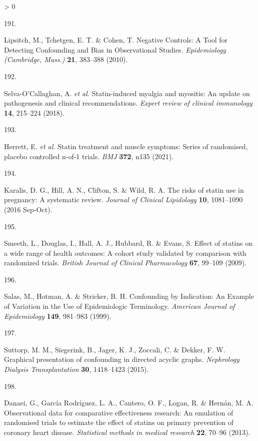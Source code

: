 \documentclass[a4paper, twoside]{templates/ociamthesis}
\newlength{\cslhangindent}
\newlength{\csllabelwidth}
\newenvironment{CSLReferences}[3] %
 {%
  \setlength{\parindent}{0pt}
  \ifodd #1 \everypar{\setlength{\hangindent}{\cslhangindent}}\ignorespaces\fi
  \ifnum #2 > 0
  \setlength{\parskip}{#2\baselineskip}
  \fi
 }%
 {}
\newcommand{\CSLLeftMargin}[1]{\parbox[t]{\maxof{\widthof{#1}}{\csllabelwidth}}{#1}}
\newcommand{\CSLRightInline}[1]{\parbox[t]{\linewidth - \csllabelwidth}{#1}}
\begin{document}
\begin{CSLReferences}{0}{0}
\leavevmode\hypertarget{ref-lipsitch2010}{}%
\CSLLeftMargin{191. }
\CSLRightInline{Lipsitch, M., Tchetgen, E. T. \& Cohen, T. Negative {Controls}: {A Tool} for {Detecting Confounding} and {Bias} in {Observational Studies}. \emph{Epidemiology (Cambridge, Mass.)} \textbf{21}, 383--388 (2010).}

\leavevmode\hypertarget{ref-selva-ocallaghan2018}{}%
\CSLLeftMargin{192. }
\CSLRightInline{Selva-O'Callaghan, A. \emph{et al.} Statin-induced myalgia and myositis: An update on pathogenesis and clinical recommendations. \emph{Expert review of clinical immunology} \textbf{14}, 215--224 (2018).}

\leavevmode\hypertarget{ref-herrett2021}{}%
\CSLLeftMargin{193. }
\CSLRightInline{Herrett, E. \emph{et al.} Statin treatment and muscle symptoms: Series of randomised, placebo controlled n-of-1 trials. \emph{BMJ} \textbf{372}, n135 (2021).}

\leavevmode\hypertarget{ref-karalis2016}{}%
\CSLLeftMargin{194. }
\CSLRightInline{Karalis, D. G., Hill, A. N., Clifton, S. \& Wild, R. A. The risks of statin use in pregnancy: {A} systematic review. \emph{Journal of Clinical Lipidology} \textbf{10}, 1081--1090 (2016 Sep-Oct).}

\leavevmode\hypertarget{ref-smeeth2009}{}%
\CSLLeftMargin{195. }
\CSLRightInline{Smeeth, L., Douglas, I., Hall, A. J., Hubbard, R. \& Evans, S. Effect of statins on a wide range of health outcomes: A cohort study validated by comparison with randomized trials. \emph{British Journal of Clinical Pharmacology} \textbf{67}, 99--109 (2009).}

\leavevmode\hypertarget{ref-salas1999}{}%
\CSLLeftMargin{196. }
\CSLRightInline{Salas, M., Hotman, A. \& Stricker, B. H. Confounding by {Indication}: {An Example} of {Variation} in the {Use} of {Epidemiologic Terminology}. \emph{American Journal of Epidemiology} \textbf{149}, 981--983 (1999).}

\leavevmode\hypertarget{ref-suttorp2015}{}%
\CSLLeftMargin{197. }
\CSLRightInline{Suttorp, M. M., Siegerink, B., Jager, K. J., Zoccali, C. \& Dekker, F. W. Graphical presentation of confounding in directed acyclic graphs. \emph{Nephrology Dialysis Transplantation} \textbf{30}, 1418--1423 (2015).}

\leavevmode\hypertarget{ref-danaei2013b}{}%
\CSLLeftMargin{198. }
\CSLRightInline{Danaei, G., García Rodríguez, L. A., Cantero, O. F., Logan, R. \& Hernán, M. A. Observational data for comparative effectiveness research: An emulation of randomised trials to estimate the effect of statins on primary prevention of coronary heart disease. \emph{Statistical methods in medical research} \textbf{22}, 70--96 (2013).}


\end{CSLReferences}
\end{document}
